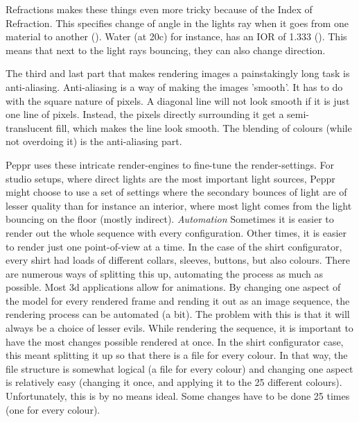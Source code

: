 Refractions makes these things even more tricky because of the Index of Refraction. This specifies change of angle in the lights ray when it goes from one material to another (\cite{refractiveIndex}). Water (at 20c) for instance, has an IOR of 1.333 (\cite{waterIOR}). This means that next to the light rays bouncing, they can also change direction.

The third and last part that makes rendering images a painstakingly long task is anti-aliasing. Anti-aliasing is a way of making the images 'smooth'. It has to do with the square nature of pixels. A diagonal line will not look smooth if it is just one line of pixels. Instead, the pixels directly surrounding it get a semi-translucent fill, which makes the line look smooth. The blending of colours (while not overdoing it) is the anti-aliasing part.

Peppr uses these intricate render-engines to fine-tune the render-settings. For studio setups, where direct lights are the most important light sources, Peppr might choose to use a set of settings where the secondary bounces of light are of lesser quality than for instance an interior, where most light comes from the light bouncing on the floor (mostly indirect).
\newline
\newline
\textit{Automation}
\newline
Sometimes it is easier to render out the whole sequence with every configuration. Other times, it is easier to render just one point-of-view at a time. In the case of the shirt configurator, every shirt had loads of different collars, sleeves, buttons, but also colours. There are numerous ways of splitting this up, automating the process as much as possible. Most 3d applications allow for animations. By changing one aspect of the model for every rendered frame and rending it out as an image sequence, the rendering process can be automated (a bit). The problem with this is that it will always be a choice of lesser evils. While rendering the sequence, it is important to have the most changes possible rendered at once. In the shirt configurator case, this meant splitting it up so that there is a file for every colour. In that way, the file structure is somewhat logical (a file for every colour) and changing one aspect is relatively easy (changing it once, and applying it to the 25 different colours). Unfortunately, this is by no means ideal. Some changes have to be done 25 times (one for every colour).


